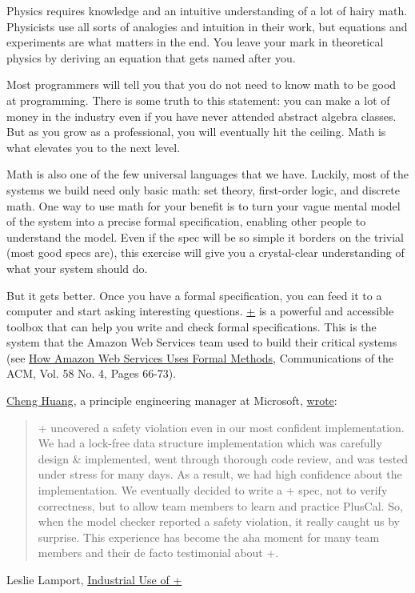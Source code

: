 \documentclass{article}
\begin{document}
Physics requires knowledge and an intuitive understanding of a lot of hairy math.
Physicists use all sorts of analogies and intuition in their work, but equations and experiments are what matters in the end.
You leave your mark in theoretical physics by deriving an equation that gets named after you.

Most programmers will tell you that you do not need to know math to be good at programming.
There is some truth to this statement: you can make a lot of money in the industry even if you have never attended abstract algebra classes.
But as you grow as a professional, you will eventually hit the ceiling.
Math is what elevates you to the next level.

Math is also one of the few universal languages that we have.
Luckily, most of the systems we build need only basic math: set theory, first-order logic, and discrete math.
One way to use math for your benefit is to turn your vague mental model of the system into a precise formal specification, enabling other people to understand the model.
Even if the spec will be so simple it borders on the trivial (most good specs are), this exercise will give you a crystal-clear understanding of what your system should do.

But it gets better.
Once you have a formal specification, you can feed it to a computer and start asking interesting questions.
\href{https://lamport.azurewebsites.net/video/videos.html}{+} is a powerful and accessible toolbox that can help you write and check formal specifications.
This is the system that the Amazon Web Services team used to build their critical systems (see \href{https://lamport.azurewebsites.net/tla/formal-methods-amazon.pdf}{How Amazon Web Services Uses Formal Methods}, Communications of the ACM, Vol. 58 No. 4, Pages 66-73).

\href{https://www.linkedin.com/in/chenghuang/}{Cheng Huang}, a principle engineering manager at Microsoft, \href{https://lamport.azurewebsites.net/tla/industrial-use.html}{wrote}:
\blockquote{
  + uncovered a safety violation even in our most confident implementation.
  We had a lock-free data structure implementation which was carefully design \& implemented, went through thorough code review, and was tested under stress for many days.
  As a result, we had high confidence about the implementation.
  We eventually decided to write a + spec, not to verify correctness, but to allow team members to learn and practice PlusCal.
  So, when the model checker reported a safety violation, it really caught us by surprise.
  This experience has become the aha moment for many team members and their de facto testimonial about +.
}{Leslie Lamport, \href{https://lamport.azurewebsites.net/tla/industrial-use.html}{Industrial Use of +}}
\end{document}
